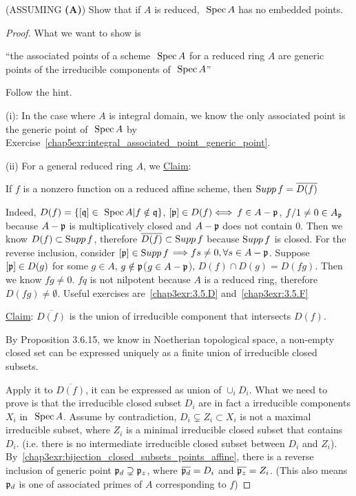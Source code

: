 \documentclass[11pt]{book} %
\begin{document}
\begin{exr}(ASSUMING \textbf{(A)})
Show that if $A$ is reduced, $\text{ Spec\,} A$ has no embedded points.
\end{exr}
\begin{proof}
What we want to show is 

``the associated points of a scheme $\text{ Spec\,} A$ for a reduced ring $A$ are generic points of the irreducible components of $\text{ Spec\,} A$''

Follow the hint.

(i): In the case where $A$ is integral domain, we know the only associated point is the generic point of $\text{ Spec\,} A$ by Exercise~\ref{chap5exr:integral_associated_point_generic_point}.

(ii) For a general reduced ring $A$, we \underline{Claim}:

If $f$ is a nonzero function on a reduced affine scheme,  then ${\text Supp\thinspace} f = \overline{D(f)}$

Indeed, $D(f)=\{[\mathfrak q]\in\text{ Spec\,} A|f\notin \mathfrak q\}$, $[{\mathfrak p}]\in D(f)\Longleftrightarrow$ $f\in A-{\mathfrak p}$, $f/1\neq 0\in A_{\mathfrak p}$ because $A-{\mathfrak p}$ is multiplicatively closed and $A-{\mathfrak p}$ does not contain $0$. Then we know $D(f)\subset {\text Supp\thinspace} f$, therefore $\overline{D(f)}\subset{\text Supp\thinspace} f$ because ${\text Supp\thinspace} f$ is closed. 
For the reverse inclusion, consider $[{\mathfrak p}]\in{\text Supp\thinspace} f$ $\Longrightarrow fs\neq 0, \forall s\in A-{\mathfrak p}$. Suppose $[{\mathfrak p}]\in D(g)$ for some $g\in A$, $g\notin {\mathfrak p}$($g\in A-{\mathfrak p}$), $D(f)\cap D(g)=D(fg)$. Then we know $fg\neq 0$. $fq$ is not nilpotent because $A$ is a reduced ring, therefore $D(fg)\neq \emptyset$. Useful exercises are~\ref{chap3exr:3.5.D} and~\ref{chap3exr:3.5.F}

\underline{Claim}: $\overline{D(f)}$ is the union of irreducible component that intersects $D(f)$. 

By Proposition 3.6.15, we know in Noetherian topological space, a non-empty closed set can be expressed uniquely as a finite union of irreducible closed subsets.

 Apply it to $\overline{D(f)}$, it can be expressed as union of $\cup_i D_i$. What we need to prove is that the irreducible closed subset $D_i$ are in fact a irreducible components $X_i$ in $\text{ Spec\,} A$. 
Assume by contradiction, $D_i\subsetneq Z_i\subset X_i$ is not a maximal irreducible subset, where $Z_i$ is a minimal irreducible closed subset that contains $D_i$. (i.e. there is no intermediate irreducible closed subset between $D_i$ and $Z_i$). By~\ref{chap3exr:bijection_closed_subsets_points_affine}, there is a reverse inclusion of generic point ${\mathfrak p}_d\supsetneq {\mathfrak p}_z$, where $\overline{{\mathfrak p}_d}=D_i$ and $\overline{{\mathfrak p}_z}=Z_i$. (This also means ${\mathfrak p}_d$ is one of  associated primes of $A$ corresponding to $f$)


\end{proof}
\end{document}
